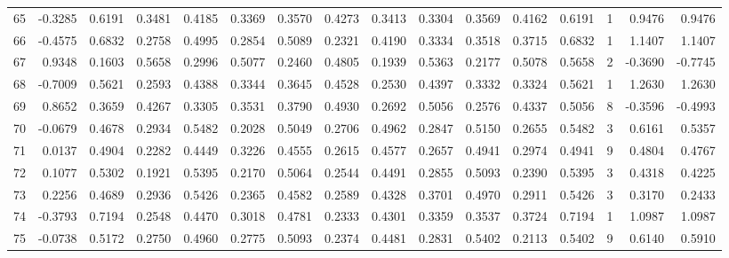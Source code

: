 \begin{tabular}{lrrrrrrrrrrrrrrr}
65  &     -0.3285 &  0.6191 &  0.3481 &  0.4185 &  0.3369 &  0.3570 &  0.4273 &  0.3413 &  0.3304 &  0.3569 &   0.4162 &     0.6191 &      1 &                    0.9476 &                     0.9476 \\
66  &     -0.4575 &  0.6832 &  0.2758 &  0.4995 &  0.2854 &  0.5089 &  0.2321 &  0.4190 &  0.3334 &  0.3518 &   0.3715 &     0.6832 &      1 &                    1.1407 &                     1.1407 \\
67  &      0.9348 &  0.1603 &  0.5658 &  0.2996 &  0.5077 &  0.2460 &  0.4805 &  0.1939 &  0.5363 &  0.2177 &   0.5078 &     0.5658 &      2 &                   -0.3690 &                    -0.7745 \\
68  &     -0.7009 &  0.5621 &  0.2593 &  0.4388 &  0.3344 &  0.3645 &  0.4528 &  0.2530 &  0.4397 &  0.3332 &   0.3324 &     0.5621 &      1 &                    1.2630 &                     1.2630 \\
69  &      0.8652 &  0.3659 &  0.4267 &  0.3305 &  0.3531 &  0.3790 &  0.4930 &  0.2692 &  0.5056 &  0.2576 &   0.4337 &     0.5056 &      8 &                   -0.3596 &                    -0.4993 \\
70  &     -0.0679 &  0.4678 &  0.2934 &  0.5482 &  0.2028 &  0.5049 &  0.2706 &  0.4962 &  0.2847 &  0.5150 &   0.2655 &     0.5482 &      3 &                    0.6161 &                     0.5357 \\
71  &      0.0137 &  0.4904 &  0.2282 &  0.4449 &  0.3226 &  0.4555 &  0.2615 &  0.4577 &  0.2657 &  0.4941 &   0.2974 &     0.4941 &      9 &                    0.4804 &                     0.4767 \\
72  &      0.1077 &  0.5302 &  0.1921 &  0.5395 &  0.2170 &  0.5064 &  0.2544 &  0.4491 &  0.2855 &  0.5093 &   0.2390 &     0.5395 &      3 &                    0.4318 &                     0.4225 \\
73  &      0.2256 &  0.4689 &  0.2936 &  0.5426 &  0.2365 &  0.4582 &  0.2589 &  0.4328 &  0.3701 &  0.4970 &   0.2911 &     0.5426 &      3 &                    0.3170 &                     0.2433 \\
74  &     -0.3793 &  0.7194 &  0.2548 &  0.4470 &  0.3018 &  0.4781 &  0.2333 &  0.4301 &  0.3359 &  0.3537 &   0.3724 &     0.7194 &      1 &                    1.0987 &                     1.0987 \\
75  &     -0.0738 &  0.5172 &  0.2750 &  0.4960 &  0.2775 &  0.5093 &  0.2374 &  0.4481 &  0.2831 &  0.5402 &   0.2113 &     0.5402 &      9 &                    0.6140 &                     0.5910 \\

\end{tabular}
